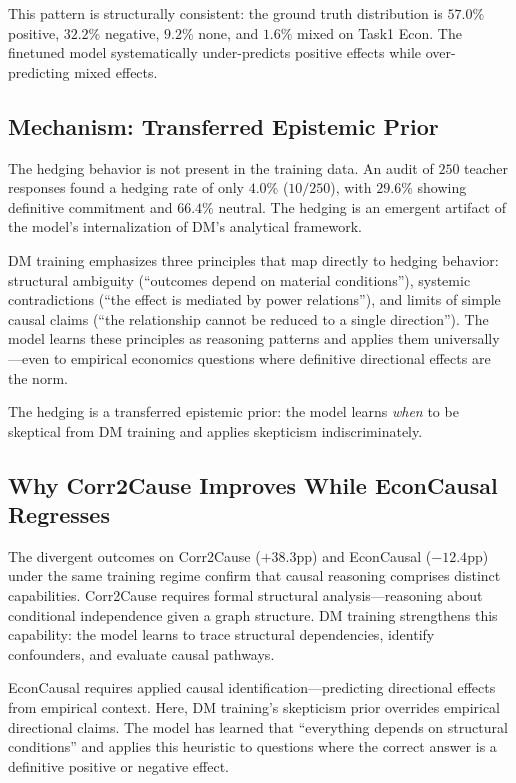 \documentclass[11pt]{article}
\begin{document}
This pattern is structurally consistent: the ground truth distribution is $57.0\%$ positive, $32.2\%$ negative, $9.2\%$ none, and $1.6\%$ mixed on Task1 Econ. The finetuned model systematically under-predicts positive effects while over-predicting mixed effects.

\subsection{Mechanism: Transferred Epistemic Prior}

The hedging behavior is not present in the training data. An audit of $250$ teacher responses found a hedging rate of only $4.0\%$ ($10/250$), with $29.6\%$ showing definitive commitment and $66.4\%$ neutral. The hedging is an emergent artifact of the model's internalization of DM's analytical framework.

DM training emphasizes three principles that map directly to hedging behavior: structural ambiguity (``outcomes depend on material conditions''), systemic contradictions (``the effect is mediated by power relations''), and limits of simple causal claims (``the relationship cannot be reduced to a single direction''). The model learns these principles as reasoning patterns and applies them universally---even to empirical economics questions where definitive directional effects are the norm.

The hedging is a transferred epistemic prior: the model learns \textit{when} to be skeptical from DM training and applies skepticism indiscriminately.

\subsection{Why Corr2Cause Improves While EconCausal Regresses}

The divergent outcomes on Corr2Cause ($+38.3$pp) and EconCausal ($-12.4$pp) under the same training regime confirm that causal reasoning comprises distinct capabilities. Corr2Cause requires formal structural analysis---reasoning about conditional independence given a graph structure. DM training strengthens this capability: the model learns to trace structural dependencies, identify confounders, and evaluate causal pathways.

EconCausal requires applied causal identification---predicting directional effects from empirical context. Here, DM training's skepticism prior overrides empirical directional claims. The model has learned that ``everything depends on structural conditions'' and applies this heuristic to questions where the correct answer is a definitive positive or negative effect.
\end{document}
